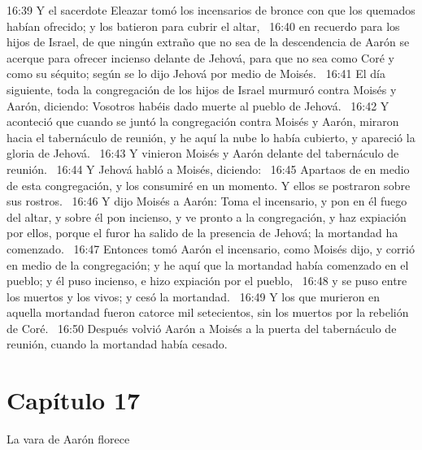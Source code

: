 16:39 Y el sacerdote Eleazar tomó los incensarios de bronce con que los quemados habían ofrecido; y los batieron para cubrir el altar,  
16:40 en recuerdo para los hijos de Israel, de que ningún extraño que no sea de la descendencia de Aarón se acerque para ofrecer incienso delante de Jehová, para que no sea como Coré y como su séquito; según se lo dijo Jehová por medio de Moisés.  
16:41 El día siguiente, toda la congregación de los hijos de Israel murmuró contra Moisés y Aarón, diciendo: Vosotros habéis dado muerte al pueblo de Jehová.  
16:42 Y aconteció que cuando se juntó la congregación contra Moisés y Aarón, miraron hacia el tabernáculo de reunión, y he aquí la nube lo había cubierto, y apareció la gloria de Jehová.  
16:43 Y vinieron Moisés y Aarón delante del tabernáculo de reunión.  
16:44 Y Jehová habló a Moisés, diciendo:  
16:45 Apartaos de en medio de esta congregación, y los consumiré en un momento. Y ellos se postraron sobre sus rostros.  
16:46 Y dijo Moisés a Aarón: Toma el incensario, y pon en él fuego del altar, y sobre él pon incienso, y ve pronto a la congregación, y haz expiación por ellos, porque el furor ha salido de la presencia de Jehová; la mortandad ha comenzado.  
16:47 Entonces tomó Aarón el incensario, como Moisés dijo, y corrió en medio de la congregación; y he aquí que la mortandad había comenzado en el pueblo; y él puso incienso, e hizo expiación por el pueblo,  
16:48 y se puso entre los muertos y los vivos; y cesó la mortandad.  
16:49 Y los que murieron en aquella mortandad fueron catorce mil setecientos, sin los muertos por la rebelión de Coré.  
16:50 Después volvió Aarón a Moisés a la puerta del tabernáculo de reunión, cuando la mortandad había cesado.  
\section*{Capítulo 17}
La vara de Aarón florece  

